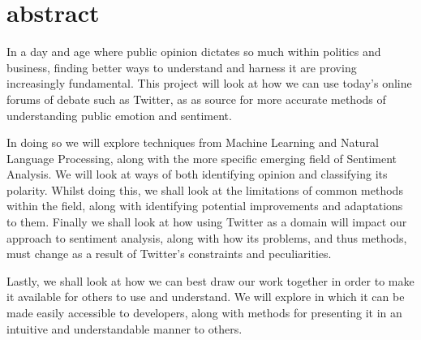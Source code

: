 \chapter*{abstract}

	In a day and age where public opinion dictates so much within politics and business, finding better ways to understand and harness it are proving increasingly fundamental. This project will look at how we can use today's online forums of debate such as Twitter, as as source for more accurate methods of understanding public emotion and sentiment. 
	
	In doing so we will explore techniques from Machine Learning and Natural Language Processing, along with the more specific emerging field of Sentiment Analysis. We will look at ways of both identifying opinion and classifying its polarity. Whilst doing this, we shall look at the limitations of common methods within the field, along with identifying potential improvements and adaptations to them. Finally we shall look at how using Twitter as a domain will impact our approach to sentiment analysis, along with how its problems, and thus methods, must change as a result of Twitter's constraints and peculiarities.
	
	Lastly, we shall look at how we can best draw our work together in order to make it available for others to use and understand. We will explore in which it can be made easily accessible to developers, along with methods for presenting it in an intuitive and understandable manner to others.